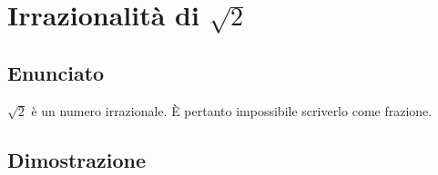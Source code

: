 \documentclass[../../analisi1]{subfiles}
\begin{document}
    \chapter{Irrazionalità di \texorpdfstring{\(\sqrt{2}\)}{radice di due}}

        \section*{Enunciato}

            \(\sqrt{2}\) è un numero irrazionale. È pertanto impossibile scriverlo come frazione.

        \section*{Dimostrazione}
\end{document}
